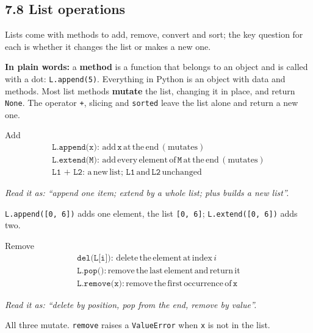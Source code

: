 \documentclass[11pt]{article}
\begin{document}
\begin{keepsection}
\section{7.8 List operations}

Lists come with methods to add, remove, convert and sort; the key question for each is whether it changes the list or makes a new one.

\begin{plainbox}\textbf{In plain words:} a \textbf{method} is a function that belongs to an object and is called with a dot: \texttt{L.append(5)}. Everything in Python is an object with data and methods. Most list methods \textbf{mutate} the list, changing it in place, and return \texttt{None}. The operator \texttt{+}, slicing and \texttt{sorted} leave the list alone and return a new one.\end{plainbox}

\begin{equationcard}{Add}
\[ \begin{gathered} \texttt{L.append(x)}:\, \text{add}\, \texttt{x}\, \text{at}\, \text{the}\, \text{end}\, (\text{mutates}) \\ \texttt{L.extend(M)}:\, \text{add}\, \text{every}\, \text{element}\, \text{of}\, \texttt{M}\, \text{at}\, \text{the}\, \text{end}\, (\text{mutates}) \\ \texttt{L1 + L2}:\, \mathrm{a}\, \text{new}\, \text{list};\, \texttt{L1}\, \text{and}\, \texttt{L2}\, \text{unchanged} \end{gathered} \]
{\small \emph{Read it as: “append one item; extend by a whole list; plus builds a new list”.}\par  \texttt{L.append([0, 6])} adds one element, the list \texttt{[0, 6]}; \texttt{L.extend([0, 6])} adds two.}
\end{equationcard}

\begin{equationcard}{Remove}
\[ \begin{gathered} \texttt{del(L[i])}:\, \text{delete}\, \text{the}\, \text{element}\, \text{at}\, \text{index}\, {i} \\ \texttt{L.pop()}:\, \text{remove}\, \text{the}\, \text{last}\, \text{element}\, \text{and}\, \text{return}\, \text{it} \\ \texttt{L.remove(x)}:\, \text{remove}\, \text{the}\, \text{first}\, \text{occurrence}\, \text{of}\, \texttt{x} \end{gathered} \]
{\small \emph{Read it as: “delete by position, pop from the end, remove by value”.}\par  All three mutate. \texttt{remove} raises a \texttt{ValueError} when \texttt{x} is not in the list.}
\end{equationcard}


\end{keepsection}
\end{document}
